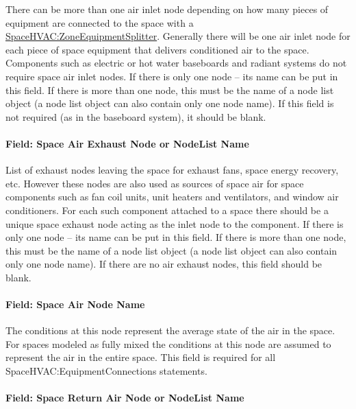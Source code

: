 There can be more than one air inlet node depending on how many pieces of equipment are connected to the space with a \hyperref[spacehvaczoneequipmentsplitter]{SpaceHVAC:ZoneEquipmentSplitter}. Generally there will be one air inlet node for each piece of space equipment that delivers conditioned air to the space. Components such as electric or hot water baseboards and radiant systems do not require space air inlet nodes. If there is only one node -- its name can be put in this field. If there is more than one node, this must be the name of a node list object (a node list object can also contain only one node name). If this field is not required (as in the baseboard system), it should be blank.

\paragraph{Field: Space Air Exhaust Node or NodeList Name}\label{field-space-air-exhaust-node-or-nodelist-name}

List of exhaust nodes leaving the space for exhaust fans, space energy recovery, etc. However these nodes are also used as sources of space air for space components such as fan coil units, unit heaters and ventilators, and window air conditioners. For each such component attached to a space there should be a unique space exhaust node acting as the inlet node to the component. If there is only one node -- its name can be put in this field. If there is more than one node, this must be the name of a node list object (a node list object can also contain only one node name). If there are no air exhaust nodes, this field should be blank.

\paragraph{Field: Space Air Node Name}\label{field-space-air-node-name}

The conditions at this node represent the average state of the air in the space. For spaces modeled as fully mixed the conditions at this node are assumed to represent the air in the entire space. This field is required for all SpaceHVAC:EquipmentConnections statements.

\paragraph{Field: Space Return Air Node or NodeList Name}\label{field-space-return-air-node-or-nodelist-name}

